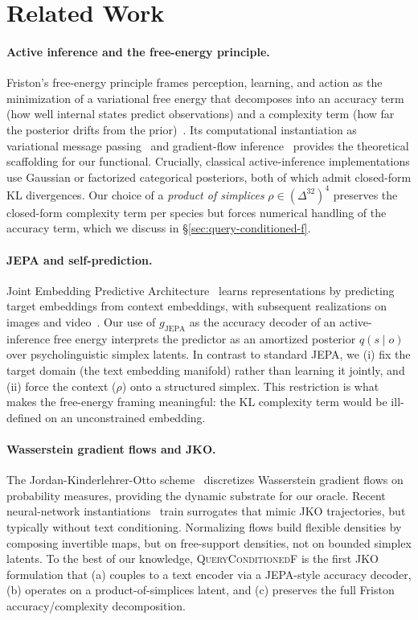 \section{Related Work}
\label{sec:related}

\paragraph{Active inference and the free-energy principle.}
Friston's free-energy principle frames perception, learning, and
action as the minimization of a variational free energy that
decomposes into an accuracy term (how well internal states predict
observations) and a complexity term (how far the posterior drifts
from the prior)~\citep{friston2010}. Its computational instantiation
as variational message passing~\citep{parr2019} and gradient-flow
inference~\citep{daCosta2020} provides the theoretical scaffolding
for our functional. Crucially, classical active-inference
implementations use Gaussian or factorized categorical posteriors,
both of which admit closed-form KL divergences. Our choice of a
\emph{product of simplices} $\rho \in (\Delta^{32})^4$ preserves the
closed-form complexity term per species but forces numerical
handling of the accuracy term, which we discuss in
\S\ref{sec:query-conditioned-f}.

\paragraph{JEPA and self-prediction.}
Joint Embedding Predictive Architecture~\citep{lecun2022} learns
representations by predicting target embeddings from context
embeddings, with subsequent realizations on images
\citep{assran2023ijepa} and video~\citep{bardes2024vjepa}. Our use of
$g_{\mathrm{JEPA}}$ as the accuracy decoder of an active-inference
free energy interprets the predictor as an amortized posterior
$q(s \mid o)$ over psycholinguistic simplex latents. In contrast to
standard JEPA, we (i) fix the target domain (the text embedding
manifold) rather than learning it jointly, and (ii) force the
context ($\rho$) onto a structured simplex. This restriction is what
makes the free-energy framing meaningful: the KL complexity term
would be ill-defined on an unconstrained embedding.

\paragraph{Wasserstein gradient flows and JKO.}
The Jordan-Kinderlehrer-Otto scheme~\citep{jko1998} discretizes
Wasserstein gradient flows on probability measures, providing the
dynamic substrate for our oracle. Recent neural-network
instantiations~\citep{bunne2022wgf} train surrogates that mimic JKO
trajectories, but typically without text conditioning. Normalizing
flows \citep{rezende2015variational} build flexible densities by
composing invertible maps, but on free-support densities, not on
bounded simplex latents. To the best of our knowledge,
\textsc{QueryConditionedF} is the first JKO formulation that
(a) couples to a text encoder via a JEPA-style accuracy decoder,
(b) operates on a product-of-simplices latent, and (c) preserves the
full Friston accuracy/complexity decomposition.

